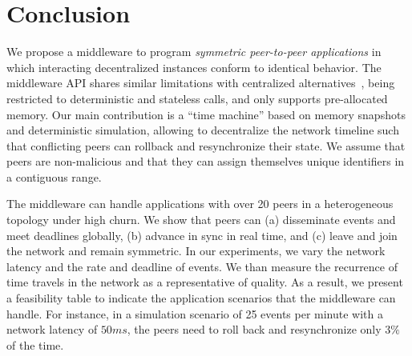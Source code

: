 \documentclass[fleqn,10pt]{SelfArx}
\begin{document}

\section{Conclusion}
\label{sec.conclusion}

We propose a middleware to program \emph{symmetric peer-to-peer applications}
in which interacting decentralized instances conform to identical behavior.
%
The middleware API shares similar limitations with centralized
alternatives~\cite{gals,croquet}, being restricted to deterministic and
stateless calls, and only supports pre-allocated memory.
%
Our main contribution is a ``time machine'' based on memory snapshots and
deterministic simulation, allowing to decentralize the network timeline such
that conflicting peers can rollback and resynchronize their state.
%
We assume that peers are non-malicious and that they can assign themselves
unique identifiers in a contiguous range.

The middleware can handle applications with over 20 peers in a heterogeneous
topology under high churn.
%
We show that peers can
    (a) disseminate events and meet deadlines globally, 
    (b) advance in sync in real time, and
    (c) leave and join the network and remain symmetric.
%
In our experiments, we vary the network latency and the rate and deadline of
events.
We than measure the recurrence of time travels in the network as a
representative of quality.
%
As a result, we present a feasibility table to indicate the application
scenarios that the middleware can handle.
For instance, in a simulation scenario of 25 events per minute with a network
latency of $50ms$, the peers need to roll back and resynchronize only $3\%$ of
the time.




\makeatletter
\renewcommand\@biblabel[1]{{\parbox{0.7cm}{[#1]}}}
\makeatother
\renewcommand{\refname}{References}


\balance
\end{document}
